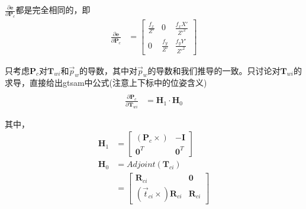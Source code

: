 \documentclass{article}
\begin{document}
$ \frac{\partial{\boldsymbol{e}}}{\partial{\boldsymbol{P}_c}}$都是完全相同的，即
$$
\begin{aligned}
	\frac{\partial{\boldsymbol{e}}}{\partial{\boldsymbol{P}_c}}&=
	\left[ 
	\begin{matrix}
	\frac{f_x}{Z'} & 0              & \frac{f_xX'}{Z'^2} \\
	0              & \frac{f_y}{Z'} & \frac{f_yY'}{Z'^2} 
	\end{matrix}
	\right]
\end{aligned}
$$

只考虑$\boldsymbol{P}_c$对$\boldsymbol{T}_{wi}$和$\vec{p}_w$的导数，其中对$\vec{p}_w$的导数和我们推导的一致。只讨论对$\boldsymbol{T}_{wi}$的求导，直接给出gtsam中公式(注意上下标中的位姿含义)
\begin{equation}
	\begin{aligned}
		\\
		\frac{\partial{\boldsymbol{P}_c}}{\partial{\boldsymbol{T}_{wi}}} & =   \boldsymbol{H}_1\cdot \boldsymbol{H}_0 
		\label{Gtsam_dPc_dTiw}
	\end{aligned}
\end{equation}

其中，
$$
\begin{aligned}
	\boldsymbol{H}_1                         & =                   
	\left[                        
	\begin{matrix}
	(\boldsymbol{P}_c\times)                 & -\boldsymbol{I}     \\
	\boldsymbol{0}^T                         & \boldsymbol{0}^T    
	\end{matrix}
	\right]\\
	\boldsymbol{H}_0                         & =                   
	Adjoint(\boldsymbol{T}_{ci}) \\& =                   
	\left[                        
	\begin{matrix}
	\boldsymbol{R}_{ci}                      & \boldsymbol{0}      \\
	(\vec{t}_{ci}\times) \boldsymbol{R}_{ci} & \boldsymbol{R}_{ci} 
	\end{matrix}
	\right]
\end{aligned}
$$
\end{document}
